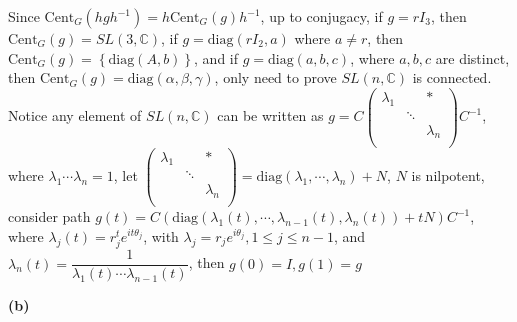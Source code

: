 \documentclass[10pt]{article}
\newcommand{\<}[1]{\langle #1 \rangle}
\begin{document}
Since $\mathrm{Cent}_G(hgh^{-1})=h\mathrm{Cent}_G(g)h^{-1}$, up to conjugacy, if $g=rI_3$, then $\mathrm{Cent}_G(g)=SL(3,\mathbb C)$, if $g=\mathrm{diag}(rI_2,a)$ where $a\neq r$, then $\mathrm{Cent}_G(g)=\left\{\mathrm{diag}(A,b)\right\}$, and if $g=\mathrm{diag}(a,b,c)$, where $a,b,c$ are distinct, then $\mathrm{Cent}_G(g)=\mathrm{diag}(\alpha, \beta, \gamma)$, only need to prove $SL(n,\mathbb C)$ is connected. Notice any element of $SL(n,\mathbb C)$ can be written as $g=C\left( {\begin{array}{ccc}
\lambda_1 &  & * \\
& \ddots &  \\
 & & \lambda_n\\
\end{array} } \right)C^{-1}$, where $\lambda_1\cdots\lambda_n=1$, let $\left( {\begin{array}{ccc}
\lambda_1 &  & * \\
& \ddots &  \\
 & & \lambda_n\\
\end{array} } \right)=\mathrm{diag}(\lambda_1,\cdots,\lambda_n)+N$, $N$ is nilpotent, consider path $g(t)=C\left(\mathrm{diag}(\lambda_1(t),\cdots,\lambda_{n-1}(t),\lambda_n(t))+tN\right)C^{-1}$, where $\lambda_j(t)=r_j^te^{it\theta_j}$, with $\lambda_j=r_je^{i\theta_j}, 1\leq j\leq n-1$, and $\lambda_n(t)=\dfrac{1}{\lambda_1(t)\cdots\lambda_{n-1}(t)}$, then $g(0)=I, g(1)=g$ \par
\textbf{(b)} \par
\end{document}
